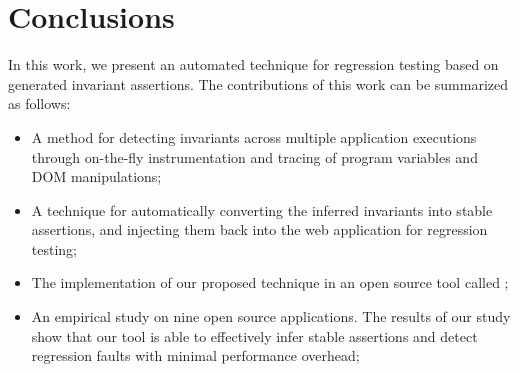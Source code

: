 \section{Conclusions}
\label{Sec:conclusion}
In this work, we present an automated technique for \javascript regression testing based on 
generated invariant assertions. The contributions of this work can be summarized as follows:
\begin{itemize}
\item A method for detecting \javascript invariants across multiple application executions
through on-the-fly \javascript instrumentation and tracing of program variables and DOM manipulations;
\item A technique for automatically converting the inferred invariants into stable assertions,
and injecting them back into the web application for regression testing;
\item The implementation of our proposed technique in an open source
tool called \jsart;
\item An empirical study on nine open source \javascript applications. The results of our study show that our tool is able to effectively infer stable assertions and 
detect regression faults with minimal performance overhead;
\end{itemize}
